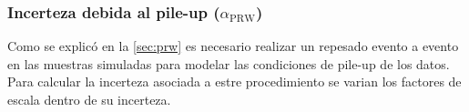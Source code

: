 \subsubsection{Incerteza debida al pile-up ($\alpha_\mathrm{PRW}$)}

Como se explicó en la \cref{sec:prw} es necesario realizar
un repesado evento a evento en las muestras simuladas para modelar las condiciones
de pile-up de los datos. Para calcular la incerteza asociada a estre procedimiento
se varian los factores de escala dentro de su incerteza.












